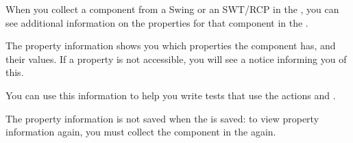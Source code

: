 
When you collect a component from a Swing or an SWT/RCP \gdaut{} in the \gdomm{} , you can see additional information on the properties for that component in the \gdpropview{}. 

The property information shows you which properties the component has, and their values. If a property is not accessible, you will see a notice informing you of this. 

You can use this information to help you write tests that use the actions  and . 

The property information is not saved when the \gdomeditor{} is saved: to view property information again, you must collect the component in the \gdomm{} again. 


